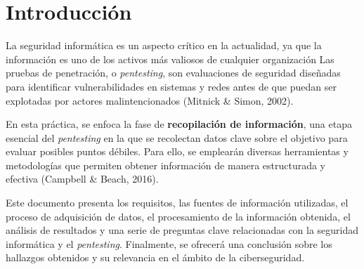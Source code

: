 \section{Introducción}

La seguridad informática es un aspecto crítico en la actualidad, ya que la información es uno de los activos más valiosos de cualquier organización
Las pruebas de penetración, o \textit{pentesting}, son evaluaciones de seguridad diseñadas para identificar vulnerabilidades en sistemas y redes antes de que puedan ser explotadas por actores malintencionados (Mitnick & Simon, 2002).

En esta práctica, se enfoca la fase de \textbf{recopilación de información}, una etapa esencial del \textit{pentesting} en la que se recolectan datos clave sobre el objetivo para evaluar posibles puntos débiles. 
Para ello, se emplearán diversas herramientas y metodologías que permiten obtener información de manera estructurada y efectiva (Campbell & Beach, 2016).

Este documento presenta los requisitos, las fuentes de información utilizadas, el proceso de adquisición de datos, el procesamiento de la información obtenida, el análisis de resultados y una serie de preguntas clave relacionadas con la seguridad informática y el \textit{pentesting}. 
Finalmente, se ofrecerá una conclusión sobre los hallazgos obtenidos y su relevancia en el ámbito de la ciberseguridad.



